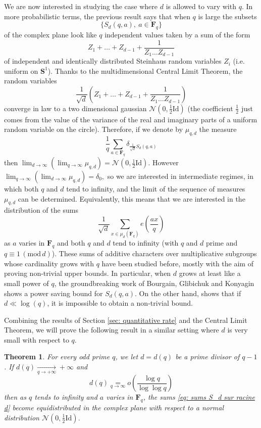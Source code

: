 \documentclass[12pt]{amsart}
\renewcommand{\mathcal}{\mathscr}
\newcommand{\Ss}{\mathbf{S}}
\newcommand{\Ff}{\mathbf{F}}
\newcommand{\mods}[1]{\,(\mathrm{mod}\,{#1})}
\theoremstyle{plain}
\newtheorem{theorem}{Theorem}[section]
\theoremstyle{remark}
\theoremstyle{definition}
\newcommand{\mcN}{\mathcal{N}}
\begin{document}
We are now interested in studying the case where $d$ is allowed to
vary with $q$. In more probabilistic terms, the previous result says
that when $q$ is large the subsets $$\{S_d(q,a), \ a \in \Ff_q \}$$ of
the complex plane look like $q$ independent values taken by a sum of
the form $$Z_1 + \dots + Z_{d-1} + \frac{1}{Z_1 \dots Z_{d-1}}$$ of
independent and identically distributed Steinhaus random variables
$Z_i$ (i.e. uniform on $\Ss^1$). Thanks to the multidimensional
Central Limit Theorem, the random variables
$$
\frac{1}{\sqrt{d}} \left(Z_1 + \dots + Z_{d-1} +
  \frac{1}{Z_1 \dots Z_{d-1}}\right)
$$
converge in law to a two dimensional gaussian
$\mcN(0, \frac12 \mathrm{Id})$ (the coefficient $\frac12$ just comes
from the value of the variance of the real and imaginary parts of a
uniform random variable on the circle). Therefore, if we denote by
$\mu_{q,d}$ the measure
$$
\frac{1}{q} \sum_{a \in \Ff_q}^{} \delta_{\frac{1}{\sqrt{d}} S_d(q,a)}
$$
then
$\lim_{d \to \infty} \left(\lim_{q \to \infty} \mu_{q,d}\right) =
\mcN(0, \frac12 \mathrm{Id}).$ However
$\lim_{q \to \infty} \left(\lim_{d \to \infty} \mu_{q,d}\right) =
\delta_0,$ so we are interested in intermediate regimes, in which both
$q$ and $d$ tend to infinity, and the limit of the sequence of
measures $\mu_{q,d}$ can be determined. Equivalently, this means that
we are interested in the distribution of the sums
\begin{equation} \label{eq: sums S_d sur racine d} \frac{1}{\sqrt{d}}
  \sum_{x \in \mu_d(\Ff_q)}^{} e\left(\frac{ax}{q}\right)
\end{equation}
as $a$ varies in $\Ff_q$ and both $q$ and $d$ tend to infinity (with
$q$ and $d$ prime and $q \equiv 1 \mods{d}$). These sums of additive
characters over multiplicative subgroups whose cardinality grows with
$q$ have been studied before, mostly with the aim of proving
non-trivial upper bounds. In particular, when $d$ grows at least like
a small power of $q$, the groundbreaking work of Bourgain, Glibichuk
and Konyagin \cite{BGK} shows a power saving bound for $S_d(q,a)$. On
the other hand, \cite[Th. 1.8]{konyagin_lecture_notes} shows that if
$d \ll \log(q)$, it is impossible to obtain a non-trivial bound.

Combining the results of Section \ref{sec: quantitative rate} and the
Central Limit Theorem, we will prove the following result in a similar setting where $d$
is very small with respect to $q$.

\begin{theorem}\label{th: growing subgroups}
  For every odd prime $q$, we let $d= d(q)$ be a prime divisor of
  $q-1$. If $d(q) \underset{q \to +\infty}{\longrightarrow} + \infty$
  and
  $$
  d(q) \underset{q \to \infty}{=} o\left( \frac{\log q}{ \log \log
      q}\right)
  $$
  then as $q$ tends to infinity and $a$ varies in $\Ff_q$, the sums
  \eqref{eq: sums S_d sur racine d} become equidistributed in the
  complex plane with respect to a normal distribution
  $\mcN(0, \frac12 \mathrm{Id})$.
\end{theorem}
\end{document}
